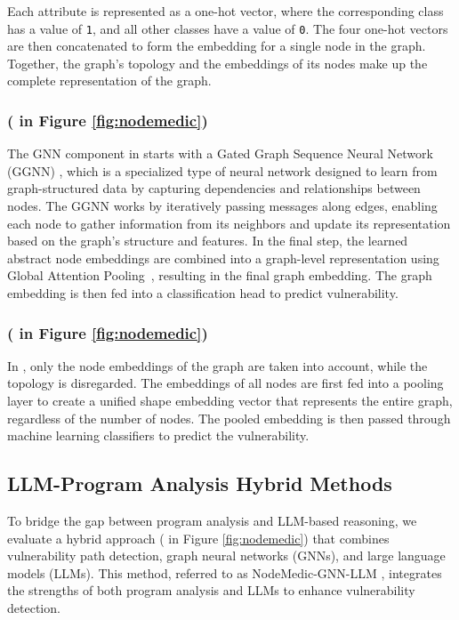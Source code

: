 \documentclass[12pt,openany,oneside,table]{cmuthesis}
\begin{document}
Each attribute is represented as a one-hot vector, where the corresponding class has a value of \texttt{1}, and all other classes have a value of \texttt{0}. The four one-hot vectors are then concatenated to form the embedding for a single node in the graph. Together, the graph's topology and the embeddings of its nodes make up the complete representation of the graph.

\subsubsection{ \textup{( in Figure \ref{fig:nodemedic})}}

The GNN component in  starts with a Gated Graph Sequence Neural Network (GGNN) \cite{li2015gated}, which is a specialized type of neural network designed to learn from graph-structured data by capturing dependencies and relationships between nodes. The GGNN works by iteratively passing messages along edges, enabling each node to gather information from its neighbors and update its representation based on the graph’s structure and features. In the final step, the learned abstract node embeddings are combined into a graph-level representation using Global Attention Pooling~\cite{li2015gated}, resulting in the final graph embedding. The graph embedding is then fed into a classification head to predict vulnerability.\sloppy



\subsubsection{ \textup{( in Figure \ref{fig:nodemedic})}}

In , only the node embeddings of the graph are taken into account, while the topology is disregarded. The embeddings of all nodes are first fed into a pooling layer to create a unified shape embedding vector that represents the entire graph, regardless of the number of nodes. The pooled embedding is then passed through machine learning classifiers to predict the vulnerability.

\subsection{LLM-Program Analysis Hybrid Methods}

To bridge the gap between program analysis and LLM-based reasoning, we evaluate a hybrid approach \textup{( in Figure \ref{fig:nodemedic})} that combines  vulnerability path detection, graph neural networks (GNNs), and large language models (LLMs). This method, referred to as NodeMedic-GNN-LLM , integrates the strengths of both program analysis and LLMs to enhance vulnerability detection. 
\end{document}
